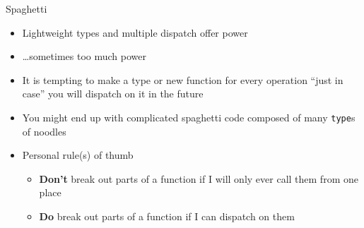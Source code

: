\documentclass[compress,10pt]{beamer}
\begin{document}
\begin{frame}{Spaghetti}

\begin{itemize}
\itemsep1pt\parskip0pt
\item
  Lightweight types and multiple dispatch offer power
\item
  \ldots{}sometimes too much power
\item
  It is tempting to make a type or new function for every operation
  ``just in case'' you will dispatch on it in the future
\item
  You might end up with complicated spaghetti code composed of many
  \texttt{type}s of noodles
\item
  Personal rule(s) of thumb

  \begin{itemize}
  \itemsep1pt\parskip0pt
  \item
    \textbf{Don't} break out parts of a function if I will only ever
    call them from one place
  \item
    \textbf{Do} break out parts of a function if I can dispatch on them
  \end{itemize}
\end{itemize}

\end{frame}
\end{document}
